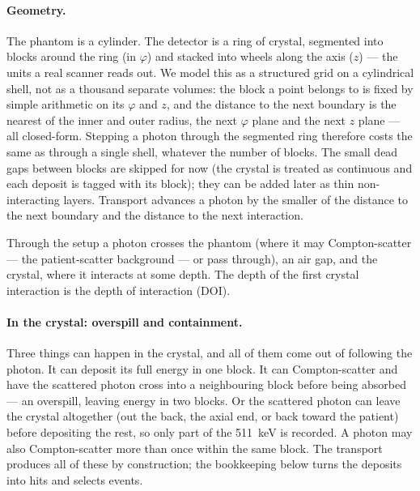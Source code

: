 \documentclass[11pt]{article}
\begin{document}
\paragraph{Geometry.}
The phantom is a cylinder. The detector is a ring of crystal, segmented into blocks around
the ring (in $\varphi$) and stacked into wheels along the axis ($z$) --- the units a real
scanner reads out. We model this as a structured grid on a cylindrical shell, not as a
thousand separate volumes: the block a point belongs to is fixed by simple arithmetic on
its $\varphi$ and $z$, and the distance to the next boundary is the nearest of the inner
and outer radius, the next $\varphi$ plane and the next $z$ plane --- all closed-form.
Stepping a photon through the segmented ring therefore costs the same as through a single
shell, whatever the number of blocks. The small dead gaps between blocks are skipped for
now (the crystal is treated as continuous and each deposit is tagged with its block); they
can be added later as thin non-interacting layers. Transport advances a photon by the
smaller of the distance to the next boundary and the distance to the next interaction.

Through the setup a photon crosses the phantom (where it may Compton-scatter --- the
patient-scatter background --- or pass through), an air gap, and the crystal, where it
interacts at some depth. The depth of the first crystal interaction is the depth of
interaction (DOI).

\paragraph{In the crystal: overspill and containment.}
Three things can happen in the crystal, and all of them come out of following the photon.
It can deposit its full energy in one block. It can Compton-scatter and have the scattered
photon cross into a neighbouring block before being absorbed --- an overspill, leaving
energy in two blocks. Or the scattered photon can leave the crystal altogether (out the
back, the axial end, or back toward the patient) before depositing the rest, so only part
of the \SI{511}{keV} is recorded. A photon may also Compton-scatter more than once within
the same block. The transport produces all of these by construction; the bookkeeping below
turns the deposits into hits and selects events.
\end{document}
